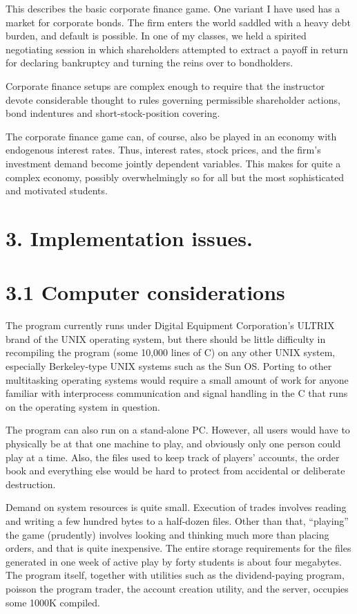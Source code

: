 This describes the basic corporate finance game.  One variant I have used 
has a market for corporate bonds.  The firm enters the world saddled with 
a heavy debt burden, and default is possible.  In one of my classes, we 
held a spirited negotiating session in which shareholders attempted to 
extract a payoff in return for declaring bankruptcy and turning the 
reins over to bondholders. 
 
Corporate finance setups are complex enough to require that the instructor 
devote considerable thought to rules governing permissible shareholder 
actions, bond indentures and short-stock-position covering. 
 
The corporate finance game can, of course, also be played in an economy 
with endogenous interest rates.  Thus, interest rates, stock prices, 
and the firm's investment demand become jointly dependent variables. 
This makes for quite a complex economy, possibly overwhelmingly so for 
all but the most sophisticated and motivated students. 
 
\section{3. Implementation issues.}%
\section{3.1 Computer considerations}%
The program currently runs under Digital Equipment Corporation's 
ULTRIX brand of the UNIX operating system, but there should be little 
difficulty in recompiling the program (some 10,000 lines of C) on any other 
UNIX system, especially Berkeley-type UNIX systems such as the Sun OS. 
Porting to other multitasking operating systems would require a small 
amount of work for anyone familiar with interprocess communication 
and signal handling in the C that runs on the operating system in 
question. 
 
The program can also run on a stand-alone PC.  However, all users would 
have to physically be at that one machine to play, and obviously only 
one person could play at a time.  Also, the files used to keep track of 
players' accounts, the order book and everything else would be hard to 
protect from accidental or deliberate destruction. 
 
Demand on system resources is quite small.  Execution of trades 
involves reading and writing a few hundred bytes to a half-dozen 
files.  Other than that, ``playing'' the game (prudently) involves 
looking and thinking much more than placing orders, and that is quite 
inexpensive.  The entire storage requirements for the files generated 
in one week of active play by forty students is about four megabytes. 
The program itself, together with utilities such as the dividend-paying 
program, poisson the program trader, the account creation utility, 
and the server, occupies some 1000K compiled. 
 

